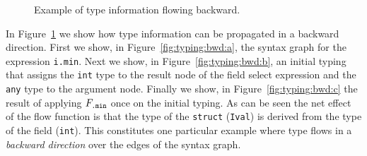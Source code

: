 \documentclass{sigplanconf}
\newcommand{\mt}[1]{\text{\tt #1}}
\begin{document}
\begin{figure}[t]
{
 }
\caption{Example of type information flowing backward.}\label{fig:typing:bwd}
\end{figure}
In Figure~\ref{fig:typing:bwd} we show how type information can be
propagated in a backward direction. First we show, in
Figure~\ref{fig:typing:bwd:a}, the syntax graph for the expression
\verb+i.min+. Next we show, in Figure~\ref{fig:typing:bwd:b}, an
initial typing that assigns the \verb+int+ type to the result node of
the field select expression and the \verb+any+ type to the argument
node. Finally we show, in Figure~\ref{fig:typing:bwd:c} the result of
applying $F_\mt{.min}$ once on the initial typing. As can be seen the
net effect of the flow function is that the type of the \verb+struct+
(\verb+Ival+) is derived from the type of the field (\verb+int+). This
constitutes one particular example where type flows in a
\emph{backward direction} over the edges of the syntax graph.
\end{document}
